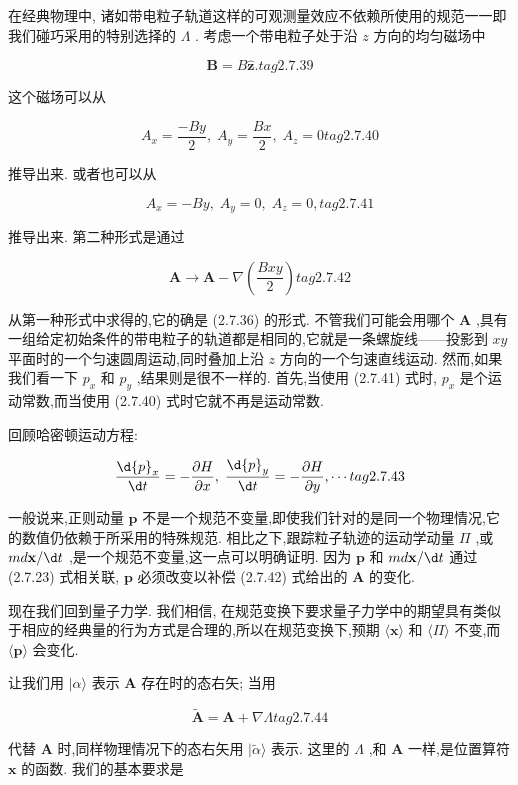 \documentclass[lang=cn,newtx,10pt,scheme=chinese,thmcnt=section]{elegantbook}
\begin{document}
在经典物理中, 诸如带电粒子轨道这样的可观测量效应不依赖所使用的规范一一即我们碰巧采用的特别选择的 $\Lambda$ . 考虑一个带电粒子处于沿 $z$ 方向的均匀磁场中

$$
\mathbf{B} = B\widehat{\mathbf{z}}\text{.} tag{2. 7.39}
$$

这个磁场可以从

$$
{A}_{x} = \frac{-{By}}{2},\;{A}_{y} = \frac{Bx}{2},\;{A}_{z} = 0 tag{2. 7.40}
$$

推导出来. 或者也可以从

$$
{A}_{x} = - {By},\;{A}_{y} = 0,\;{A}_{z} = 0, tag{2. 7.41}
$$

推导出来. 第二种形式是通过

$$
\mathbf{A} \rightarrow \mathbf{A} - \nabla \left( \frac{Bxy}{2}\right) tag{2. 7.42}
$$

从第一种形式中求得的,它的确是 (2.7.36) 的形式. 不管我们可能会用哪个 $\mathbf{A}$ ,具有一组给定初始条件的带电粒子的轨道都是相同的,它就是一条螺旋线——投影到 ${xy}$ 平面时的一个匀速圆周运动,同时叠加上沿 $z$ 方向的一个匀速直线运动. 然而,如果我们看一下 ${p}_{x}$ 和 ${p}_{y}$ ,结果则是很不一样的. 首先,当使用 (2.7.41) 式时, ${p}_{x}$ 是个运动常数,而当使用 (2.7.40) 式时它就不再是运动常数.

回顾哈密顿运动方程:

$$
\frac{\d {p}_{x}}{\d t} = - \frac{\partial H}{\partial x},\;\frac{\d {p}_{y}}{\d t} = - \frac{\partial H}{\partial y},\cdots tag{2. 7.43}
$$

一般说来,正则动量 $\mathbf{p}$ 不是一个规范不变量,即使我们针对的是同一个物理情况,它的数值仍依赖于所采用的特殊规范. 相比之下,跟踪粒子轨迹的运动学动量 $\Pi$ ,或 ${md}\mathbf{x}/{\d t}$ ,是一个规范不变量,这一点可以明确证明. 因为 $\mathbf{p}$ 和 ${md}\mathbf{x}/{\d t}$ 通过 (2.7.23) 式相关联, $\mathbf{p}$ 必须改变以补偿 (2.7.42) 式给出的 $\mathbf{A}$ 的变化.

现在我们回到量子力学. 我们相信, 在规范变换下要求量子力学中的期望具有类似于相应的经典量的行为方式是合理的,所以在规范变换下,预期 $\langle \mathbf{x}\rangle$ 和 $\langle \Pi \rangle$ 不变,而 $\langle \mathbf{p}\rangle$ 会变化.

让我们用 $|\alpha \rangle$ 表示 $\mathbf{A}$ 存在时的态右矢; 当用

$$
\widetilde{\mathbf{A}} = \mathbf{A} + \nabla \Lambda tag{2.7.44}
$$

代替 $\mathbf{A}$ 时,同样物理情况下的态右矢用 $|\widetilde{\alpha }\rangle$ 表示. 这里的 $\Lambda$ ,和 $\mathbf{A}$ 一样,是位置算符 $\mathbf{x}$ 的函数. 我们的基本要求是
\end{document}
